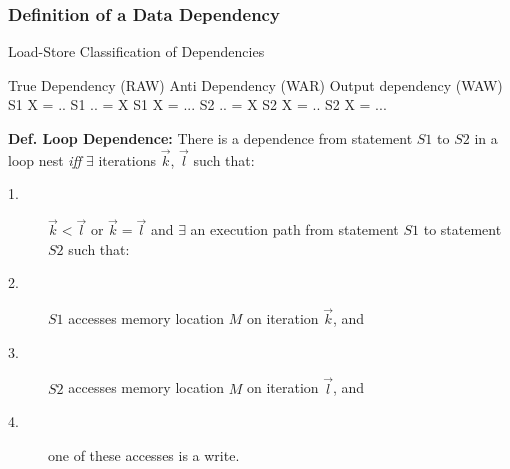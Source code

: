 \documentclass{beamer}
\newcommand{\emp}[1]{\textcolor{DikuRed}{ #1}}
\begin{document}
\begin{frame}[fragile,t]
  \frametitle{Definition of a Data Dependency} %
\vspace{-2ex}
\begin{block}{Load-Store Classification of Dependencies}
\begin{colorcode}
True Dependency (RAW)    Anti Dependency (WAR)    Output dependency (WAW)
S1    X  = ..            S1    .. = X             S1    X = ...            
S2    .. = X             S2    X  = ..            S2    X = ...
\end{colorcode}
\end{block} 
\pause
\bigskip

{\bf Def. Loop Dependence:} There is a dependence from statement $S1$ to $S2$
in a loop nest {\em iff} $\exists$ iterations $\vec{k}$, $\vec{l}$ such that:
\begin{description}
    \item[1.] $\vec{k} < \vec{l}$ or $\vec{k} = \vec{l}$ and $\exists$ 
                an execution path from statement $S1$ to statement $S2$ \emp{such that:}
    \item[2.] $S1$ accesses memory location $M$ on iteration $\vec{k}$, and
    \item[3.] $S2$ accesses memory location $M$ on iteration $\vec{l}$, and
    \item[4.] one of these accesses is a write.
\end{description}
\medskip


\end{frame}
\end{document}
